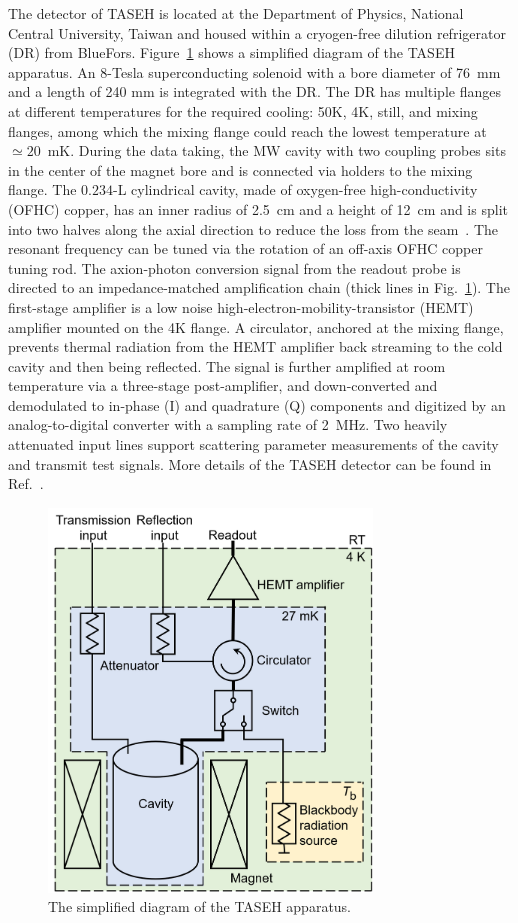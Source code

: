 \documentclass[%
 reprint,prl, %
superscriptaddress,
nobibnotes,
 amsmath,amssymb,
 aps,
]{revtex4-2}
\begin{document}
The detector of TASEH is located at the Department of Physics, National 
Central University, Taiwan and housed within a cryogen-free 
dilution refrigerator (DR) from BlueFors. 
Figure~\ref{fig:TASEH} shows a simplified diagram of the TASEH apparatus. 
An 8-Tesla 
superconducting solenoid with a 
bore diameter of 76~mm and a length of 240 mm is integrated with the DR.  
The DR has multiple flanges at different temperatures for 
the required cooling: 50K, 4K, still, 
and mixing flanges, among which the mixing flange could reach the lowest 
temperature at $\simeq20$~mK. 
%
During the data taking, the MW cavity with two coupling probes 
sits in the center of the magnet bore 
and is connected via holders to the mixing flange. 
The $0.234$-L cylindrical cavity, 
made of oxygen-free high-conductivity (OFHC) copper, 
has an inner radius of 2.5~cm and a height of 12~cm and 
 is split into two halves along the axial direction to reduce the loss from 
the seam~\cite{CAPPCavity}. 
The resonant frequency can be tuned via the rotation of an off-axis OFHC 
copper tuning rod. 
The axion-photon conversion signal from the readout probe is directed to an 
impedance-matched amplification chain (thick lines in Fig.~\ref{fig:TASEH}). 
The first-stage amplifier is a low noise high-electron-mobility-transistor 
(HEMT) amplifier mounted on the 4K flange. 
A circulator, anchored at the mixing flange, 
prevents thermal radiation from the HEMT amplifier back 
streaming to the cold cavity and then being reflected.  
The signal is further amplified at room temperature via a 
three-stage post-amplifier, and down-converted 
and demodulated to in-phase (I) and quadrature (Q) components and digitized 
by an analog-to-digital converter with a sampling rate of 2~MHz. 
Two heavily attenuated input 
lines support scattering parameter measurements of the cavity and transmit 
test signals. 
More details of the TASEH detector can be found 
in Ref.~\cite{TASEHInstrumentation}. 

\begin{figure} 
  \centering
  \includegraphics[width=8.6cm]{figures/colored_Simplified_wiring_V3.png}
  \caption{%
The simplified diagram of the TASEH apparatus.}
  \label{fig:TASEH}
\end{figure}
\end{document}
